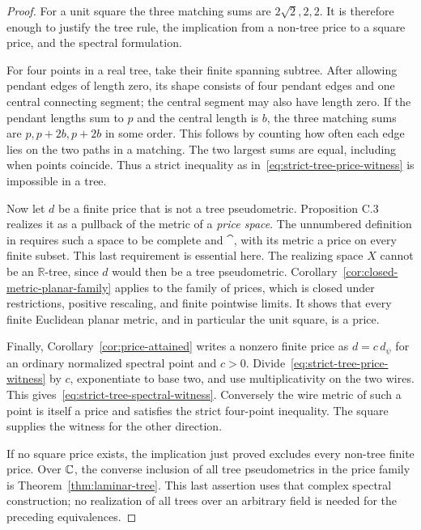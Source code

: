 \begin{proof}
For a unit square the three matching sums are $2\sqrt2,2,2$.
It is therefore enough to justify the tree rule, the implication
from a non-tree price to a square price, and the spectral formulation.

For four points in a real tree, take their finite spanning subtree.
After allowing pendant edges of length zero, its shape consists of
four pendant edges and one central connecting segment; the central
segment may also have length zero.  If the pendant lengths sum to
$p$ and the central length is $b$, the three matching sums are
$p,p+2b,p+2b$ in some order.  This follows by counting how often each
edge lies on the two paths in a matching.  The two largest sums are
equal, including when points coincide.  Thus a strict inequality
as in~\eqref{eq:strict-tree-price-witness} is impossible in a tree.

Now let $d$ be a finite price that is not a tree pseudometric.
Proposition C.3 realizes it as a pullback of the metric of a
\emph{price space}.  The unnumbered definition in
\cite[Section C.4, p.~28]{Anthropic2026} requires such a space to be
complete and $\cat$, with its metric a price on every finite subset.
This last requirement is essential here.  The realizing space $X$
cannot be an $\mathbb R$-tree, since $d$ would then be a tree
pseudometric.  Corollary~\ref{cor:closed-metric-planar-family}
applies to the family of prices, which is closed under restrictions,
positive rescaling, and finite pointwise limits.  It shows that
every finite Euclidean planar metric, and in particular the unit
square, is a price.

Finally, Corollary~\ref{cor:price-attained} writes a nonzero finite
price as $d=c\,d_\psi$ for an ordinary normalized spectral point
and $c>0$.  Divide~\eqref{eq:strict-tree-price-witness} by $c$,
exponentiate to base two, and use multiplicativity on the two wires.
This gives~\eqref{eq:strict-tree-spectral-witness}.  Conversely the
wire metric of such a point is itself a price and satisfies the
strict four-point inequality.  The square supplies the witness
for the other direction.

If no square price exists, the implication just proved excludes
every non-tree finite price.  Over $\mathbb C$, the converse inclusion of
all tree pseudometrics in the price family is
Theorem~\ref{thm:laminar-tree}.  This last assertion uses that complex
spectral construction; no realization of all trees over an arbitrary
field is needed for the preceding equivalences.
\end{proof}

